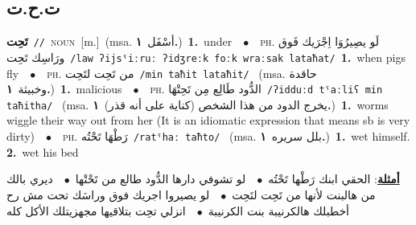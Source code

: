 \documentclass[10pt,a4paper,twoside]{article} %
\begin{document}
\begin{multicols}{2}
{{\vspace{-3mm}
\subsection*{\color{blue}\foreignlanguage{arabic}{ت.ح.ت}\color{blue}{}} 

{\setlength\topsep{0pt}\textbf{\foreignlanguage{arabic}{تَحِت}}\ {\color{gray}\texttt{//}\color{black}}\ \textsc{noun}\ [m.]\ \color{gray}(msa. \foreignlanguage{arabic}{أسْفَل}~\foreignlanguage{arabic}{\textbf{١.}})\color{black}\ \textbf{1.}~under\ \ $\bullet$\ \ \textsc{ph.} \color{gray} \foreignlanguage{arabic}{لَو يصِيرُوَا اِجْرَيك فَوق ورَاسِك تَحِت}\color{black}\ {\color{gray}\texttt{/{\sffamily law ʔijsˤiːruː ʔidʒreːk foːk wraːsak lataħat}/}\color{black}}\ \textbf{1.}~when pigs fly\ \ $\bullet$\ \ \textsc{ph.} \color{gray} \foreignlanguage{arabic}{من تَحِت لتَحِت}\color{black}\ {\color{gray}\texttt{/{\sffamily min taħit lataħit}/}\color{black}}\ \color{gray} (msa. \foreignlanguage{arabic}{حاقدة وخبيثة}~\foreignlanguage{arabic}{\textbf{١.}})\color{black}\ \textbf{1.}~malicious\ \ $\bullet$\ \ \textsc{ph.} \color{gray} \foreignlanguage{arabic}{الدُّود طَالِع مِن تَحِتْهَا}\color{black}\ {\color{gray}\texttt{/{\sffamily ʔidduːd tˤaːliʕ min taħitha}/}\color{black}}\ \color{gray} (msa. \foreignlanguage{arabic}{يخرج الدود من هذا الشخص (كناية على أنه قذر)}~\foreignlanguage{arabic}{\textbf{١.}})\color{black}\ \textbf{1.}~worms wiggle their way out from her (It is an idiomatic expression that means sb is very dirty)\ \ $\bullet$\ \ \textsc{ph.} \color{gray} \foreignlanguage{arabic}{رَطْهَا تَحْتُه}\color{black}\ {\color{gray}\texttt{/{\sffamily ratˤhaː taħto}/}\color{black}}\ \color{gray} (msa. \foreignlanguage{arabic}{بلل سريره}~\foreignlanguage{arabic}{\textbf{١.}})\color{black}\ \textbf{1.}~wet himself.  \textbf{2.}~wet his bed\  \begin{flushright}\color{gray}\foreignlanguage{arabic}{\textbf{\underline{\foreignlanguage{arabic}{أمثلة}}}: الحقي ابنك رَطْها تَحْتُه\ $\bullet$\ \  لو تشوفي دارها الدُّود طالع من تَحْتْها\ $\bullet$\ \  ديري بالك من هالبنت لأنها من تَحِت لتَحِت\ $\bullet$\ \  لو يصيروا اجريك فوق وراسَك تحت مش رح أخطبلك هالكرنيبة بنت الكرنيبة\ $\bullet$\ \  انزلي تحِت بتلاقيها مجهزيتلك الأكل كله}\end{flushright}\color{black}} \vspace{2mm}

}}
\end{multicols}
\end{document}
